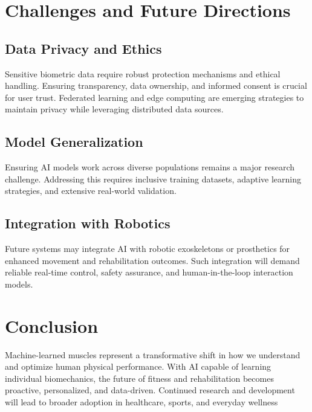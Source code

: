 \documentclass[a4paper,10pt,twocolumn]{memoir}
\begin{document}

\section*{Challenges and Future Directions}

\subsection{Data Privacy and Ethics}
Sensitive biometric data require robust protection mechanisms and ethical handling. Ensuring transparency, data ownership, and informed consent is crucial for user trust. Federated learning and edge computing are emerging strategies to maintain privacy while leveraging distributed data sources.

\subsection{Model Generalization}
Ensuring AI models work across diverse populations remains a major research challenge. Addressing this requires inclusive training datasets, adaptive learning strategies, and extensive real-world validation.

\subsection{Integration with Robotics}
Future systems may integrate AI with robotic exoskeletons or prosthetics for enhanced movement and rehabilitation outcomes. Such integration will demand reliable real-time control, safety assurance, and human-in-the-loop interaction models.

\section*{Conclusion}
Machine-learned muscles represent a transformative shift in how we understand and optimize human physical performance. With AI capable of learning individual biomechanics, the future of fitness and rehabilitation becomes proactive, personalized, and data-driven. Continued research and development will lead to broader adoption in healthcare, sports, and everyday wellness 
\end{document}
